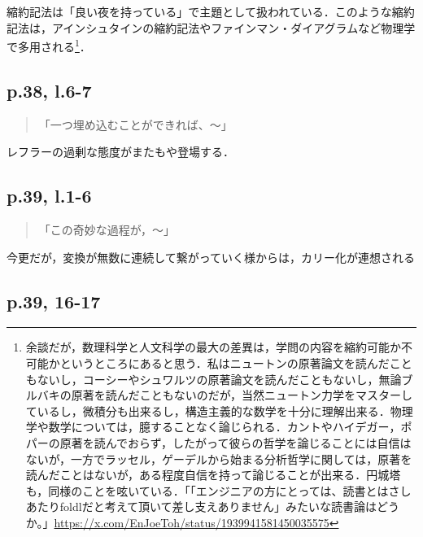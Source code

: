 \documentclass[10pt, a5paper, twoside]{jsarticle}
\theoremstyle{definition}
\begin{document}
                縮約記法は「良い夜を持っている」で主題として扱われている．このような縮約記法は，アインシュタインの縮約記法やファインマン・ダイアグラムなど物理学で多用される\footnote{余談だが，数理科学と人文科学の最大の差異は，学問の内容を縮約可能か不可能かというところにあると思う．私はニュートンの原著論文を読んだこともないし，コーシーやシュワルツの原著論文を読んだこともないし，無論ブルバキの原著を読んだこともないのだが，当然ニュートン力学をマスターしているし，微積分も出来るし，構造主義的な数学を十分に理解出来る．物理学や数学については，臆することなく論じられる．カントやハイデガー，ポパーの原著を読んでおらず，したがって彼らの哲学を論じることには自信はないが，一方でラッセル，ゲーデルから始まる分析哲学に関しては，原著を読んだことはないが，ある程度自信を持って論じることが出来る．円城塔も，同様のことを呟いている．「「エンジニアの方にとっては、読書とはさしあたりfoldlだと考えて頂いて差し支えありません」みたいな読書論はどうか。」\url{https://x.com/EnJoeToh/status/1939941581450035575}}．

            \subsection{p.38, l.6-7}

                \begin{quote}

                    「一つ埋め込むことができれば、〜」

                \end{quote}

                レフラーの過剰な態度がまたもや登場する．

            \subsection{p.39, l.1-6}

                \begin{quote}

                    「この奇妙な過程が，〜」

                \end{quote}

                今更だが，変換が無数に連続して繋がっていく様からは，カリー化が連想される


            \subsection{p.39, 16-17}
\end{document}
